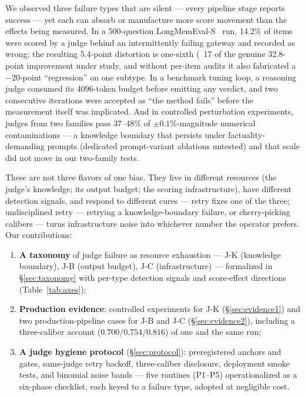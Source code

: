 \documentclass[11pt]{article}
\begin{document}
We observed three failure types that are silent --- every pipeline stage
reports success --- yet each can absorb or manufacture more score movement
than the effects being measured. In a 500-question LongMemEval-S~\cite{longmemeval} run,
14.2\% of items were scored by a judge behind an intermittently failing
gateway and recorded as wrong; the resulting 5.4-point distortion is one-sixth (~17%
of the genuine 32.8-point improvement under study, and without per-item
audits it also fabricated a $-20$-point ``regression'' on one subtype. In a
benchmark tuning loop, a reasoning judge consumed its 4096-token budget
before emitting any verdict, and two consecutive iterations were accepted as
``the method fails'' before the measurement itself was implicated. And in
controlled perturbation experiments, judges from two families pass 37--48\%
of $\pm 0.1\%$-magnitude numerical contaminations --- a knowledge boundary that
persists under factuality-demanding prompts (dedicated prompt-variant
ablations untested) and that scale did not move in our two-family tests.

These are not three flavors of one bias. They live in different resources
(the judge's knowledge; its output budget; the scoring infrastructure),
have different detection signals, and respond to different cures --- retry
fixes one of the three; undisciplined retry --- retrying a knowledge-boundary
failure, or cherry-picking calibers --- turns
infrastructure noise into whichever number the operator prefers. Our
contributions:
\begin{enumerate}\setlength{\itemsep}{-1pt}
\item \textbf{A taxonomy} of judge failure as resource exhaustion ---
      J-K (knowledge boundary), J-B (output budget), J-C (infrastructure)
      --- formalized in \S\ref{sec:taxonomy} with per-type detection
      signals and score-effect directions (Table~\ref{tab:axes});
\item \textbf{Production evidence}: controlled experiments for J-K
      (\S\ref{sec:evidence1}) and two production-pipeline cases for J-B and
      J-C (\S\ref{sec:evidence2}), including a three-caliber account
      ($0.700/0.754/0.816$) of one and the same run;
\item \textbf{A judge hygiene protocol} (\S\ref{sec:protocol}): preregistered
      anchors and gates, same-judge retry backoff, three-caliber disclosure,
      deployment smoke tests, and binomial noise bands --- five routines
      (P1--P5) operationalized as a six-phase checklist, each keyed to a
      failure type, adopted at negligible cost.
\end{enumerate}
\end{document}
